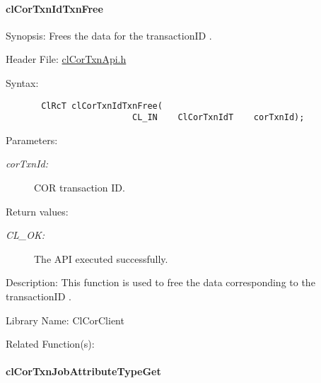 \hypertarget{pagecor505}{}\paragraph{cl\-Cor\-Txn\-Id\-Txn\-Free}\label{pagecor505}
\begin{Desc}
\item[Synopsis:]Frees the data for the transaction\-ID .\end{Desc}
\begin{Desc}
\item[Header File:]\hyperlink{cl_cor_txn_api_8h}{cl\-Cor\-Txn\-Api.h}\end{Desc}
\begin{Desc}
\item[Syntax:]

\footnotesize\begin{verbatim}       ClRcT clCorTxnIdTxnFree(
                         CL_IN    ClCorTxnIdT    corTxnId); 
\end{verbatim}
\normalsize
\end{Desc}
\begin{Desc}
\item[Parameters:]
\begin{description}
\item[{\em cor\-Txn\-Id:}]COR transaction ID.\end{description}
\end{Desc}
\begin{Desc}
\item[Return values:]
\begin{description}
\item[{\em CL\_\-OK:}]The API executed successfully.\end{description}
\end{Desc}
\begin{Desc}
\item[Description:]This function is used to free the data corresponding to the transaction\-ID .\end{Desc}
\begin{Desc}
\item[Library Name:]Cl\-Cor\-Client\end{Desc}
\begin{Desc}
\item[Related Function(s):]\end{Desc}
\hypertarget{pagecor506}{}\paragraph{cl\-Cor\-Txn\-Job\-Attribute\-Type\-Get}\label{pagecor506}
